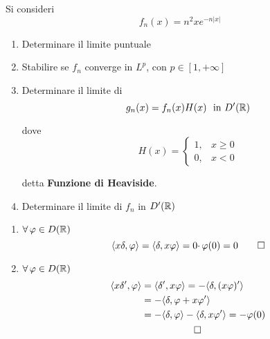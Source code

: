 Si consideri
\begin{equation*}
f_{n}( x) =n^{2} xe^{-n| x| }
\end{equation*}
\begin{enumerate}
\item Determinare il limite puntuale
\item Stabilire se $f_{n}$ converge in $L^{p}$, con $p\in [ 1,+\infty ]$
\item Determinare il limite di\begin{equation*}
g_{n}( x) =f_{n}( x) H( x) \ \ \text{in} \ D'(\mathbb{R} )
\end{equation*}

dove\begin{equation*}
H( x) =\begin{cases}
1, & x\geqslant 0\\
0, & x< 0
\end{cases}
\end{equation*}

detta \textbf{Funzione di Heaviside}.
\item Determinare il limite di $f_{n}$ in $D'(\mathbb{R} )$
\end{enumerate}
\ParteSoluzioni
\Soluzione
\begin{enumerate}
\item $\forall \varphi \in D(\RR )$\begin{equation*}
\langle x\delta ,\varphi \rangle =\langle \delta ,x\varphi \rangle =0\cdotp \varphi ( 0) =0\qed 
\end{equation*}
\item $\forall \varphi \in D(\RR )$\begin{gather*}
\begin{aligned}
\langle x\delta ',\varphi \rangle  & =\langle \delta ',x\varphi \rangle =-\langle \delta ,( x\varphi ) '\rangle \\
 & =-\langle \delta ,\varphi +x\varphi '\rangle \\
 & =-\langle \delta ,\varphi \rangle -\langle \delta ,x\varphi '\rangle =-\varphi ( 0)
\end{aligned}\\
\qed 
\end{gather*}
\end{enumerate}
\Soluzione

